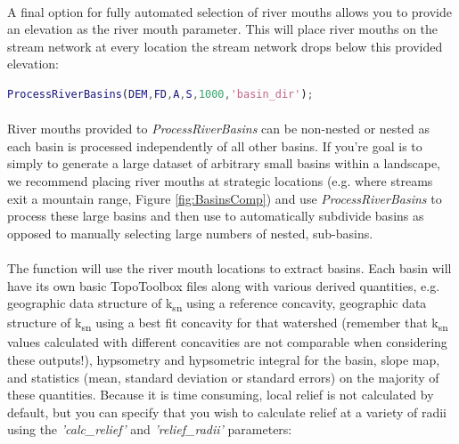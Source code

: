 \paragraph{}A final option for fully automated selection of river mouths allows you to provide an elevation as the river mouth parameter. This will place river mouths on the stream network at every location the stream network drops below this provided elevation:

\begin{lstlisting}[language=Matlab]
% To create basins with outlets above 1000 meters elevation
ProcessRiverBasins(DEM,FD,A,S,1000,'basin_dir');
\end{lstlisting}

\paragraph{}River mouths provided to \textit{ProcessRiverBasins} can be non-nested or nested as each basin is processed independently of all other basins. If you're goal is to simply to generate a large dataset of arbitrary small basins within a landscape, we recommend placing river mouths at strategic locations (e.g. where streams exit a mountain range, Figure \ref{fig:BasinsComp}) and use \textit{ProcessRiverBasins} to process these large basins and then use  to automatically subdivide basins as opposed to manually selecting large numbers of nested, sub-basins.

\paragraph{}The function will use the river mouth locations to extract basins. Each basin will have its own basic TopoToolbox files along with various derived quantities, e.g. geographic data structure of k\textsubscript{sn} using a reference concavity, geographic data structure of k\textsubscript{sn} using a best fit concavity for that watershed (remember that k\textsubscript{sn} values calculated with different concavities are not comparable when considering these outputs!), hypsometry and hypsometric integral for the basin, slope map, and statistics (mean, standard deviation or standard errors) on the majority of these quantities. Because it is time consuming, local relief is not calculated by default, but you can specify that you wish to calculate relief at a variety of radii using the \textit{'calc\_relief'} and \textit{'relief\_radii'} parameters:

